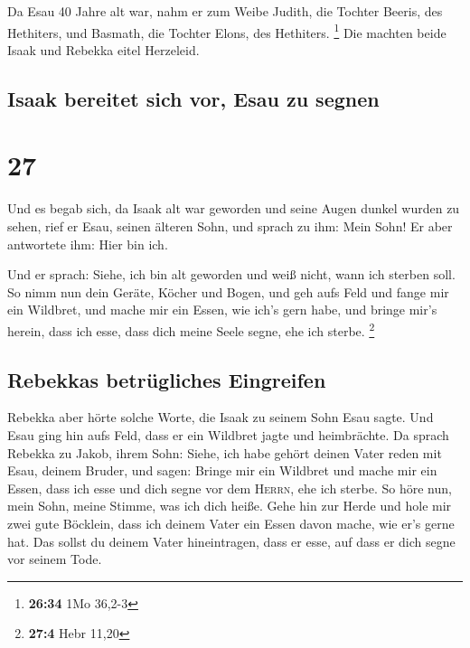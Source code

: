  Da Esau 40 Jahre alt war, nahm er zum Weibe Judith, die
Tochter Beeris, des Hethiters, und Basmath, die Tochter Elons, des
Hethiters. \footnote{\textbf{26:34} 1Mo 36,2-3}  Die
machten beide Isaak und Rebekka eitel Herzeleid.

\hypertarget{isaak-bereitet-sich-vor-esau-zu-segnen}{%
\subsection{Isaak bereitet sich vor, Esau zu
segnen}\label{isaak-bereitet-sich-vor-esau-zu-segnen}}

\hypertarget{section-26}{%
\section{27}\label{section-26}}

 Und es begab sich, da Isaak alt war geworden und seine
Augen dunkel wurden zu sehen, rief er Esau, seinen älteren Sohn, und
sprach zu ihm: Mein Sohn! Er aber antwortete ihm: Hier bin ich.

 Und er sprach: Siehe, ich bin alt geworden und weiß
nicht, wann ich sterben soll.  So nimm nun dein Geräte,
Köcher und Bogen, und geh aufs Feld und fange mir ein Wildbret,
 und mache mir ein Essen, wie ich's gern habe, und bringe
mir's herein, dass ich esse, dass dich meine Seele segne, ehe ich
sterbe. \footnote{\textbf{27:4} Hebr 11,20}

\hypertarget{rebekkas-betruxfcgliches-eingreifen}{%
\subsection{Rebekkas betrügliches
Eingreifen}\label{rebekkas-betruxfcgliches-eingreifen}}

 Rebekka aber hörte solche Worte, die Isaak zu seinem Sohn
Esau sagte. Und Esau ging hin aufs Feld, dass er ein Wildbret jagte und
heimbrächte.  Da sprach Rebekka zu Jakob, ihrem Sohn:
Siehe, ich habe gehört deinen Vater reden mit Esau, deinem Bruder, und
sagen:  Bringe mir ein Wildbret und mache mir ein Essen,
dass ich esse und dich segne vor dem \textsc{Herrn}, ehe ich sterbe.
 So höre nun, mein Sohn, meine Stimme, was ich dich heiße.
 Gehe hin zur Herde und hole mir zwei gute Böcklein, dass
ich deinem Vater ein Essen davon mache, wie er's gerne hat.
 Das sollst du deinem Vater hineintragen, dass er esse,
auf dass er dich segne vor seinem Tode.

